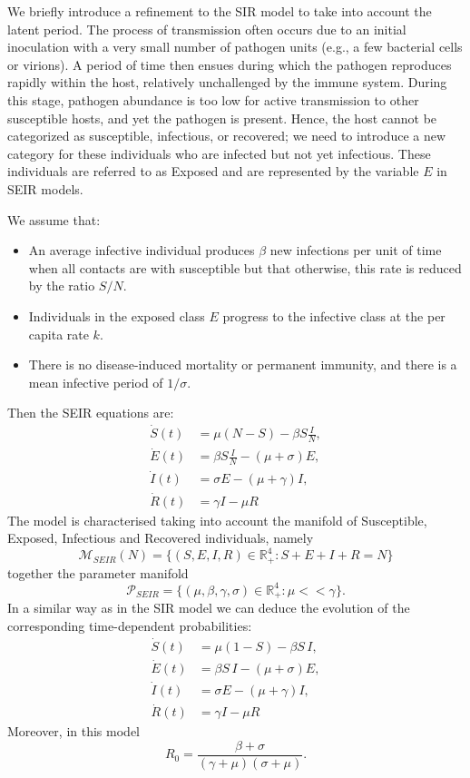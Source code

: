 \documentclass[12pt]{article}\usepackage[]{graphicx}\usepackage[]{color}
\begin{document}
We briefly introduce a refinement to the SIR model to take into account the latent period. The process of transmission often occurs due to an initial inoculation with a very small number of pathogen units (e.g., a few bacterial cells or virions). A period of time then ensues during which the pathogen reproduces rapidly within the host, relatively unchallenged by the immune system. During this stage, pathogen abundance is too low for active transmission to other susceptible hosts, and yet the pathogen is present. Hence, the host cannot be categorized as susceptible, infectious, or recovered; we need to introduce a new category for these individuals who are infected but not yet infectious. These individuals are referred to as Exposed and are represented by the variable $E$ in SEIR models.

We assume that:
\begin{itemize}
\item An average infective individual produces $\beta$ new infections per unit of time when all contacts are with susceptible but that otherwise, this rate is reduced by the ratio $S/N.$
\item Individuals in the exposed class $E$ progress to the infective class at the per capita rate $k.$
\item There is no disease-induced mortality or permanent immunity, and there is a mean infective period of $1/\sigma.$
\end{itemize}
Then the SEIR equations are:
\begin{align}
\dot{S}(t) & = \mu(N-S)-\beta S \frac{I}{N}, \label{SEIR1}\\
\dot{E}(t) & = \beta S \frac{I}{N} - (\mu+\sigma)E, \label{SEIR2} \\
\dot{I}(t) & = \sigma E - (\mu + \gamma)I, \label{SEIR3}\\
\dot{R}(t) & = \gamma I - \mu R \label{SEIR4}
\end{align}
The model is characterised taking into account the manifold of Susceptible, Exposed, Infectious and Recovered individuals, namely
$$
\mathcal{M}_{SEIR}(N) = \{(S,E,I,R) \in \mathbb{R}_+^4 : S+E+I+R = N\}
$$
together the parameter manifold
$$
\mathcal{P}_{SEIR} = \{(\mu,\beta,\gamma,\sigma) \in \mathbb{R}_+^4: \mu << \gamma\}.
$$
In a similar way as in the SIR model we can deduce the evolution of the corresponding time-dependent probabilities:
\begin{align}
\dot{S}(t) & = \mu(1-S)-\beta S \,I, \label{PSEIR1}\\
\dot{E}(t) & = \beta S \,I - (\mu+\sigma)E, \label{PSEIR2} \\
\dot{I}(t) & = \sigma E - (\mu + \gamma)I, \label{PSEIR3}\\
\dot{R}(t) & = \gamma I - \mu R \label{PSEIR4}
\end{align}
Moreover, in this model
$$
R_0 = \frac{\beta + \sigma}{(\gamma+\mu)(\sigma + \mu)}.
$$
\end{document}
